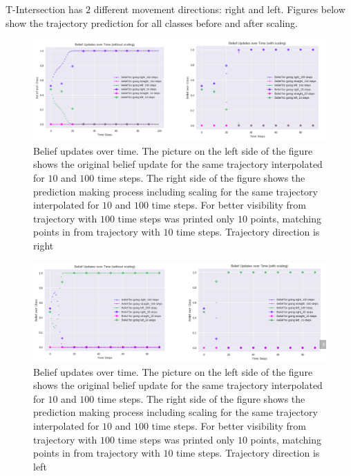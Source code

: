 T-Intersection has $2$ different movement directions: right and left. Figures below show the trajectory prediction for all classes before and after scaling.

\begin{figure}[H]
	\centering  	
	\includegraphics[width=13cm]{img/ScalingRightT.png}
	\caption{Belief updates over time. The picture on the left side of the figure shows the original belief update for the same trajectory interpolated for $10$ and $100$ time steps. The right side of the figure shows the prediction making process including scaling for the same trajectory interpolated for $10$ and $100$ time steps. For better visibility from trajectory with $100$ time steps was printed only $10$ points, matching points in from trajectory with  $10$ time steps. Trajectory direction is right}
	\label{fig:ScallingRightT}    
\end{figure}

\begin{figure}[H]
	\centering  	
	\includegraphics[width=13cm]{img/ScalingLeftT.png}
	\caption{Belief updates over time. The picture on the left side of the figure shows the original belief update for the same trajectory interpolated for $10$ and $100$ time steps. The right side of the figure shows the prediction making process including scaling for the same trajectory interpolated for $10$ and $100$ time steps. For better visibility from trajectory with $100$ time steps was printed only $10$ points, matching points in from trajectory with  $10$ time steps. Trajectory direction is left}
	\label{fig:ScallingLeftT}    
\end{figure}

